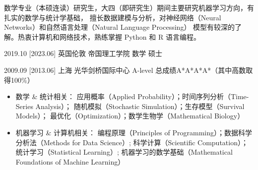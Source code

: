 \documentclass[zh]{resume}
\begin{document}
\makeheader

{\onehalfspacing\hspace{2em}%
数学专业（本硕连读）研究生，大四（即研究生）期间主要研究机器学习方向，有扎实的数学与统计学基础，
擅长数据建模与分析，对神经网络（Neural Networks）和自然语言处理（Natural Language Processing）
模型有较深的了解。热衷计算机和网络技术，熟练掌握 Python 和 R 语言编程。

\par}

\begin{competences}
\end{competences}

\begin{educations}
  \education%
    {2019.10}%
    [2023.06]%
    {英国伦敦}%
    {帝国理工学院}%
    {数学}%
    {硕士}
    
  \separator{0.5ex}
  \education%
    {2009.09}%
    [2013.06]%
    {上海}%
    {光华剑桥国际中心}%
    {A-level}%
    {总成绩A*A*A*A*（其中高数取得100\%）}
\end{educations}

\begin{itemize}
  \item 数学 \& 统计相关：
    应用概率（Applied Probability）；时间序列分析（Time-Series Analysis）；
    随机模拟（Stochastic Simulation）；生存模型（Survival Models）；
    最优化（Optimization）；数学生物学（Mathematical Biology）
  \item 机器学习 \& 计算机相关：
    编程原理（Principles of Programming）；数据科学分析法（Methods for Data Science）;
    科学计算（Scientific Computation）；统计学习（Statistical Learning）;
    机器学习的数学基础（Mathematical Foundations of Machine Learning）
\end{itemize}
\end{document}
